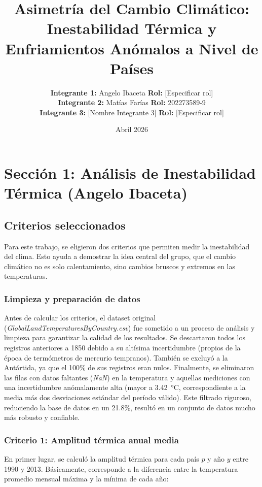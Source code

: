 \documentclass[12pt, a4paper]{article}
\title{Asimetría del Cambio Climático:\\Inestabilidad Térmica y Enfriamientos Anómalos a Nivel de Países}
\author{
    \textbf{Integrante 1:} Angelo Ibaceta \quad \textbf{Rol:} [Especificar rol] \\
    \textbf{Integrante 2:} Matías Farías \quad \textbf{Rol:} 202273589-9 \\
    \textbf{Integrante 3:} [Nombre Integrante 3] \quad \textbf{Rol:} [Especificar rol]
}
\date{Abril 2026}
\begin{document}
\maketitle

\section{Sección 1: Análisis de Inestabilidad Térmica (Angelo Ibaceta)}

\subsection{Criterios seleccionados}

Para este trabajo, se eligieron dos criterios que permiten medir la inestabilidad del clima. Esto ayuda a demostrar la idea central del grupo, que el cambio climático no es solo calentamiento, sino cambios bruscos y extremos en las temperaturas.

\subsubsection{Limpieza y preparación de datos}

Antes de calcular los criterios, el dataset original (\textit{GlobalLandTemperaturesByCountry.csv}) fue sometido a un proceso de análisis y limpieza para garantizar la calidad de los resultados. Se descartaron todos los registros anteriores a 1850 debido a su altísima incertidumbre (propios de la época de termómetros de mercurio tempranos). También se excluyó a la Antártida, ya que el 100\% de sus registros eran nulos. Finalmente, se eliminaron las filas con datos faltantes (\textit{NaN}) en la temperatura y aquellas mediciones con una incertidumbre anómalamente alta (mayor a 3.42~°C, correspondiente a la media más dos desviaciones estándar del período válido). Este filtrado riguroso, reduciendo la base de datos en un 21.8\%, resultó en un conjunto de datos mucho más robusto y confiable.

\subsubsection{Criterio 1: Amplitud térmica anual media}

En primer lugar, se calculó la amplitud térmica para cada país $p$ y año $y$ entre 1990 y 2013. Básicamente, corresponde a la diferencia entre la temperatura promedio mensual máxima y la mínima de cada año:
\end{document}
